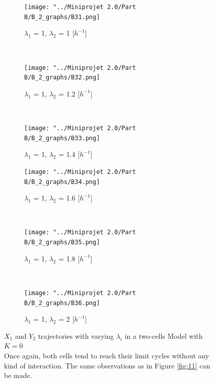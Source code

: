 \documentclass[10pt,a4paper,oneside,twocolumn]{article}
\numberwithin{equation}{section} %
\begin{document}
    \begin{figure}
    \centering
	\begin{subfigure}[b]{0.32\textwidth}
	    \texttt{[image: "../Miniprojet 2.0/Part B/B\_2\_graphs/B31.png]}
	    \caption{$\lambda_1$ = 1, $\lambda_2$ = 1 [$h^{-1}$]}
	\end{subfigure}
	~ 
	\begin{subfigure}[b]{0.32\textwidth}
	    \texttt{[image: "../Miniprojet 2.0/Part B/B\_2\_graphs/B32.png]}
	    \caption{$\lambda_1$ = 1, $\lambda_2$ = 1.2 [$h^{-1}$]}
	\end{subfigure}
	~ 
	\begin{subfigure}[b]{0.32\textwidth}
	    \texttt{[image: "../Miniprojet 2.0/Part B/B\_2\_graphs/B33.png]}
	    \caption{$\lambda_1$ = 1, $\lambda_2$ = 1.4 [$h^{-1}$]}
	\end{subfigure}
	 
	\begin{subfigure}[b]{0.32\textwidth}
	    \texttt{[image: "../Miniprojet 2.0/Part B/B\_2\_graphs/B34.png]}
	    \caption{$\lambda_1$ = 1, $\lambda_2$ = 1.6 [$h^{-1}$]}
	\end{subfigure}
	~ 
	\begin{subfigure}[b]{0.32\textwidth}
	    \texttt{[image: "../Miniprojet 2.0/Part B/B\_2\_graphs/B35.png]}
	    \caption{$\lambda_1$ = 1, $\lambda_2$ = 1.8 [$h^{-1}$]}
	\end{subfigure}
	~ 
	\begin{subfigure}[b]{0.32\textwidth}
	    \texttt{[image: "../Miniprojet 2.0/Part B/B\_2\_graphs/B36.png]}
	    \caption{$\lambda_1$ = 1, $\lambda_2$ = 2 [$h^{-1}$]}
	\end{subfigure}

	\caption{$X_1$ and $Y_2$ trajectories with varying $\lambda_i$ in a two-cells Model with $K=0$\\
	Once again, both cells tend to reach their limit cycles without any kind of interaction. The same observations as in Figure \ref{fig:11} can be made.
	}
    \end{figure}
\end{document}
